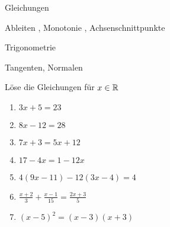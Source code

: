 



\begin{inhalt}
  \item Gleichungen 
  \item Ableiten , Monotonie , Achsenschnittpunkte 
	\item Trigonometrie 
	\item Tangenten, Normalen 
\end{inhalt}

 Löse die Gleichungen für $x\in \mathbb{R}$
\begin{multicols}{2}
  \begin{enumerate}
    \item $3x + 5 = 23$
    \item $8x - 12 = 28$
    \item $7x + 3 = 5x + 12$
		\item $17-4x=1-12x$
    \item $4(9x - 11) - 12(3x - 4) = 4$
    \item $\frac{x+2}{3} + \frac{x-1}{15} = \frac{2x+3}{5}$
		\item $(x-5)^2=(x-3)(x+3)$
  \end{enumerate}
\end{multicols}

